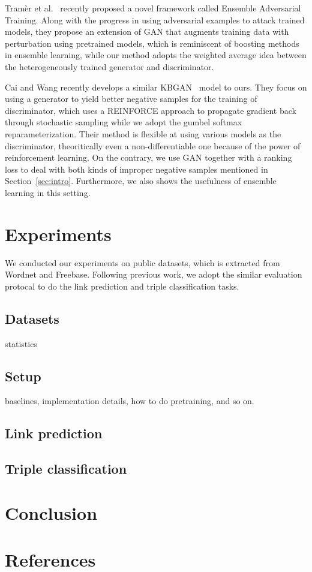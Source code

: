 \documentclass[twocolumn,a4paper,10pt,review,5p]{elsarticle}
\begin{document}
Tram\`er et al.~\cite{EnsembleAdvTraining} recently proposed a novel framework called Ensemble Adversarial Training. Along with the progress in using adversarial examples to attack trained models, they propose an extension of GAN that augments training data with perturbation using pretrained models, which is reminiscent of boosting methods in ensemble learning, while our method adopts the weighted average idea between the heterogeneously trained generator and discriminator.

Cai and Wang recently develops a similar KBGAN~\cite{Cai2017KBGAN} model to ours. They focus on using a generator to yield better negative samples for the training of discriminator, which uses a REINFORCE approach to propagate gradient back through stochastic sampling while we adopt the gumbel softmax reparameterization. Their method is flexible at using various models as the discriminator, theoritically even a non-differentiable one because of the power of reinforcement learning. On the contrary, we use GAN together with a ranking loss to deal with both kinds of improper negative samples mentioned in Section~\ref{sec:intro}. Furthermore, we also shows the usefulness of ensemble learning in this setting.




\section{Experiments}

We conducted our experiments on public datasets, which is extracted from Wordnet and Freebase. Following previous work, we adopt the similar evaluation protocal to do the link prediction and triple classification tasks.

\subsection{Datasets}

statistics

\subsection{Setup}

baselines, implementation details, how to do pretraining, and so on.

\subsection{Link prediction}

\subsection{Triple classification}


\section{Conclusion}

\section*{References}


\end{document}
